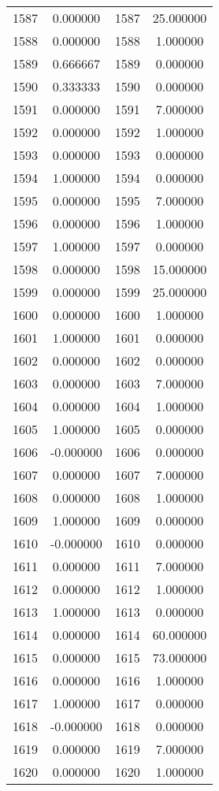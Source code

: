 \documentclass[12pt]{article}
\begin{document}
\begin{longtable}{@{}cccc@{}}
1587 & 0.000000 & 1587 & 25.000000 \\
1588 & 0.000000 & 1588 & 1.000000 \\
1589 & 0.666667 & 1589 & 0.000000 \\
1590 & 0.333333 & 1590 & 0.000000 \\
1591 & 0.000000 & 1591 & 7.000000 \\
1592 & 0.000000 & 1592 & 1.000000 \\
1593 & 0.000000 & 1593 & 0.000000 \\
1594 & 1.000000 & 1594 & 0.000000 \\
1595 & 0.000000 & 1595 & 7.000000 \\
1596 & 0.000000 & 1596 & 1.000000 \\
1597 & 1.000000 & 1597 & 0.000000 \\
1598 & 0.000000 & 1598 & 15.000000 \\
1599 & 0.000000 & 1599 & 25.000000 \\
1600 & 0.000000 & 1600 & 1.000000 \\
1601 & 1.000000 & 1601 & 0.000000 \\
1602 & 0.000000 & 1602 & 0.000000 \\
1603 & 0.000000 & 1603 & 7.000000 \\
1604 & 0.000000 & 1604 & 1.000000 \\
1605 & 1.000000 & 1605 & 0.000000 \\
1606 & -0.000000 & 1606 & 0.000000 \\
1607 & 0.000000 & 1607 & 7.000000 \\
1608 & 0.000000 & 1608 & 1.000000 \\
1609 & 1.000000 & 1609 & 0.000000 \\
1610 & -0.000000 & 1610 & 0.000000 \\
1611 & 0.000000 & 1611 & 7.000000 \\
1612 & 0.000000 & 1612 & 1.000000 \\
1613 & 1.000000 & 1613 & 0.000000 \\
1614 & 0.000000 & 1614 & 60.000000 \\
1615 & 0.000000 & 1615 & 73.000000 \\
1616 & 0.000000 & 1616 & 1.000000 \\
1617 & 1.000000 & 1617 & 0.000000 \\
1618 & -0.000000 & 1618 & 0.000000 \\
1619 & 0.000000 & 1619 & 7.000000 \\
1620 & 0.000000 & 1620 & 1.000000 \\

\end{longtable}
\end{document}
